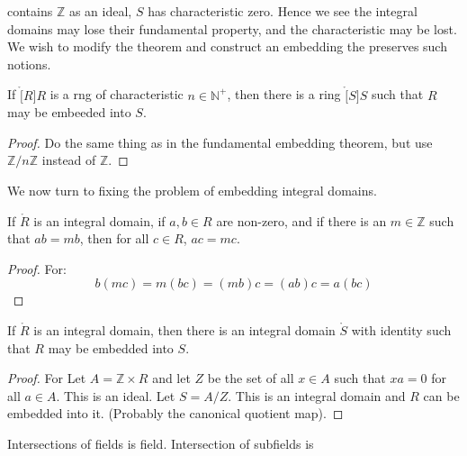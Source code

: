 \documentclass{article}                                                        %
\begin{document}
                contains $\mathbb{Z}$ as an ideal, $S$ has characteristic zero.
                Hence we see the integral domains may lose their fundamental
                property, and the characteristic may be lost. We wish to modify
                the theorem and construct an embedding the preserves such
                notions.
                \begin{theorem}
                    If $\ring[R]{R}$ is a rng of characteristic
                    $n\in\mathbb{N}^{+}$, then there is a ring $\ring[S]{S}$
                    such that $R$ may be embeeded into $S$.
                \end{theorem}
                \begin{proof}
                    Do the same thing as in the fundamental embedding theorem,
                    but use $\mathbb{Z}/n\mathbb{Z}$ instead of $\mathbb{Z}$.
                \end{proof}
                We now turn to fixing the problem of embedding integral domains.
                \begin{theorem}
                    If $\ring{R}$ is an integral domain, if $a,b\in{R}$ are
                    non-zero, and if there is an $m\in\mathbb{Z}$ such that
                    $ab=mb$, then for all $c\in{R}$, $ac=mc$.
                \end{theorem}
                \begin{proof}
                    For:
                    \begin{equation}
                        b(mc)=m(bc)=(mb)c=(ab)c=a(bc)
                    \end{equation}
                \end{proof}
                \begin{theorem}
                    If $\ring{R}$ is an integral domain, then there is an
                    integral domain $\ring{S}$ with identity such that $R$
                    may be embedded into $S$.
                \end{theorem}
                \begin{proof}
                    For Let $A=\mathbb{Z}\times{R}$ and let $Z$ be the set of
                    all $x\in{A}$ such that $xa=0$ for all $a\in{A}$. This is an
                    ideal. Let $S=A/Z$. This is an integral domain and $R$ can
                    be embedded into it. (Probably the canonical quotient map).
                \end{proof}
                Intersections of fields is field. Intersection of subfields is
\end{document}
